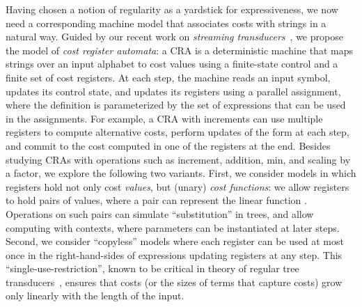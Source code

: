 \documentclass[11pt]{article}
\begin{document}
Having chosen a notion of regularity as a yardstick for
expressiveness, we now need a corresponding machine model that
associates costs with strings in a natural way.  Guided by our recent
work on {\em streaming
transducers\/}~\cite{alur_streaming_2011,alur_stt_2011}, we propose
the model of {\em cost register automata}: a CRA is a deterministic
machine that maps strings over an input alphabet to cost values using
a finite-state control and a finite set of cost registers.  At each
step, the machine reads an input symbol, updates its control state,
and updates its registers using a parallel assignment, where the
definition is parameterized by the set of expressions that can be used
in the assignments.  For example, a CRA with increments can use
multiple registers to compute alternative costs, perform updates of
the form  at each step, and commit to the cost computed in
one of the registers at the end.  Besides studying CRAs with
operations such as increment, addition, min, and scaling by a factor,
we explore the following two variants.  First, we consider models in
which registers hold not only cost {\em values}, but (unary) {\em cost
functions\/}: we allow registers to hold pairs of values, where a pair
 can represent the linear function .  Operations on
such pairs can simulate ``substitution'' in trees, and allow computing
with contexts, where parameters can be instantiated at later steps.
Second, we consider ``copyless'' models where each register can be
used at most once in the right-hand-sides of expressions updating
registers at any step.  This ``single-use-restriction'', known to be
critical in theory of regular tree
transducers~\cite{engelfriet_macro2_1999}, ensures that costs (or the
sizes of terms that capture costs) grow only linearly with the length
of the input.
\end{document}
